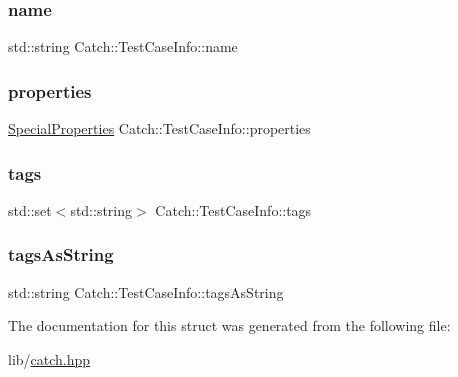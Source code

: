 \subsubsection{\texorpdfstring{name}{name}}
{\footnotesize\ttfamily std\+::string Catch\+::\+Test\+Case\+Info\+::name}

\hypertarget{struct_catch_1_1_test_case_info_afc1e84bd7a2e180895a06d9131302af0}{}\label{struct_catch_1_1_test_case_info_afc1e84bd7a2e180895a06d9131302af0} 
\subsubsection{\texorpdfstring{properties}{properties}}
{\footnotesize\ttfamily \hyperlink{struct_catch_1_1_test_case_info_a39b232f74b4a7a6f2183b96759027eac}{Special\+Properties} Catch\+::\+Test\+Case\+Info\+::properties}

\hypertarget{struct_catch_1_1_test_case_info_a045f62e7719a8760a5b456f7fd2dc97c}{}\label{struct_catch_1_1_test_case_info_a045f62e7719a8760a5b456f7fd2dc97c} 
\subsubsection{\texorpdfstring{tags}{tags}}
{\footnotesize\ttfamily std\+::set$<$std\+::string$>$ Catch\+::\+Test\+Case\+Info\+::tags}

\hypertarget{struct_catch_1_1_test_case_info_ac65c2d36fd36f71e9bf782b2ea245c64}{}\label{struct_catch_1_1_test_case_info_ac65c2d36fd36f71e9bf782b2ea245c64} 
\subsubsection{\texorpdfstring{tags\+As\+String}{tagsAsString}}
{\footnotesize\ttfamily std\+::string Catch\+::\+Test\+Case\+Info\+::tags\+As\+String}



The documentation for this struct was generated from the following file\+:\begin{DoxyCompactItemize}
\item 
lib/\hyperlink{catch_8hpp}{catch.\+hpp}\end{DoxyCompactItemize}
